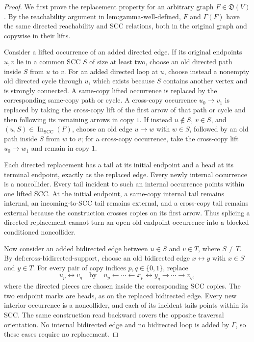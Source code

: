 \documentclass{article}
\begin{document}
\begin{proof}
We first prove the replacement property for an arbitrary graph \(F\in\mathfrak D(V)\).  By the reachability argument in \(\text{lem:gamma-well-defined}\), \(F\) and \(\Gamma(F)\) have the same directed reachability and SCC relations, both in the original graph and copywise in their lifts.

Consider a lifted occurrence of an added directed edge.  If its original endpoints \(u,v\) lie in a common SCC \(S\) of size at least two, choose an old directed path inside \(S\) from \(u\) to \(v\).  For an added directed loop at \(u\), choose instead a nonempty old directed cycle through \(u\), which exists because \(S\) contains another vertex and is strongly connected.  A same-copy lifted occurrence is replaced by the corresponding same-copy path or cycle.  A cross-copy occurrence \(u_0\to v_1\) is replaced by taking the cross-copy lift of the first arrow of that path or cycle and then following its remaining arrows in copy \(1\).  If instead \(u\notin S\), \(v\in S\), and \((u,S)\in\operatorname{In}_{\mathrm{SCC}}(F)\), choose an old edge \(u\to w\) with \(w\in S\), followed by an old path inside \(S\) from \(w\) to \(v\); for a cross-copy occurrence, take the cross-copy lift \(u_0\to w_1\) and remain in copy \(1\).

Each directed replacement has a tail at its initial endpoint and a head at its terminal endpoint, exactly as the replaced edge.  Every newly internal occurrence is a noncollider.  Every tail incident to such an internal occurrence points within one lifted SCC.  At the initial endpoint, a same-copy internal tail remains internal, an incoming-to-SCC tail remains external, and a cross-copy tail remains external because the construction crosses copies on its first arrow.  Thus splicing a directed replacement cannot turn an open old endpoint occurrence into a blocked conditioned noncollider.

Now consider an added bidirected edge between \(u\in S\) and \(v\in T\), where \(S\ne T\).  By \(\text{def:cross-bidirected-support}\), choose an old bidirected edge \(x\leftrightarrow y\) with \(x\in S\) and \(y\in T\).  For every pair of copy indices \(p,q\in\{0,1\}\), replace
\[
u_p\leftrightarrow v_q
\quad\text{by}\quad
u_p\leftarrow\cdots\leftarrow x_p
\leftrightarrow y_q\to\cdots\to v_q,
\]
where the directed pieces are chosen inside the corresponding SCC copies.  The two endpoint marks are heads, as on the replaced bidirected edge.  Every new interior occurrence is a noncollider, and each of its incident tails points within its SCC.  The same construction read backward covers the opposite traversal orientation.  No internal bidirected edge and no bidirected loop is added by \(\Gamma\), so these cases require no replacement.


\end{proof}
\end{document}
